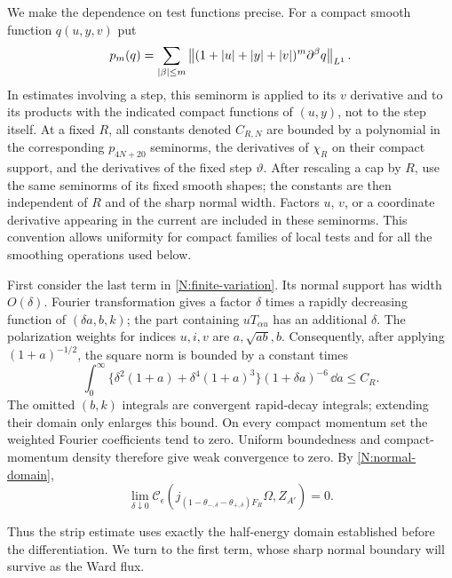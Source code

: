 We make the dependence on test functions precise.  For a compact
smooth function $q(u,y,v)$ put
\[
 p_m(q)=\sum_{|\beta|\leq m}
  \left\lVert(1+|u|+|y|+|v|)^m\partial^\beta q\right\rVert_{L^1}.
\]
In estimates involving a step, this seminorm is applied to its $v$
derivative and to its products with the indicated compact functions
of $(u,y)$, not to the step itself.  At a fixed $R$, all constants
denoted $C_{R,N}$ are bounded by a polynomial in the corresponding
$p_{4N+20}$ seminorms, the derivatives of $\chi_R$ on their compact
support, and the derivatives of the fixed step $\vartheta$.  After
rescaling a cap by $R$, use the same seminorms of its fixed smooth
shapes; the constants are then independent of $R$ and of the sharp
normal width.  Factors $u$, $v$, or a coordinate derivative appearing
in the current are included in these seminorms.  This convention
allows uniformity for compact families of local tests and for all
the smoothing operations used below.

First consider the last term in \eqref{N:finite-variation}.  Its
normal support has width $O(\delta)$.  Fourier transformation gives
a factor $\delta$ times a rapidly decreasing function of
$(\delta a,b,k)$; the part containing $uT_{\alpha u}$ has an additional
$\delta$.  The polarization weights for indices $u,i,v$ are
$a,\sqrt{ab},b$.  Consequently, after applying $(1+a)^{-1/2}$,
the square norm is bounded by a constant times
\begin{equation}\label{N:strip-bound}
 \int_0^\infty
  \bigl\{\delta^2(1+a)+\delta^4(1+a)^3\bigr\}
     (1+\delta a)^{-6}\,\dd a\leq C_R.
\end{equation}
The omitted $(b,k)$ integrals are convergent rapid-decay integrals;
extending their domain only enlarges this bound.  On every compact
momentum set the weighted Fourier coefficients tend to zero.
Uniform boundedness and compact-momentum density therefore give
weak convergence to zero.  By \eqref{N:normal-domain},
\begin{equation}\label{N:strip-vanishing}
 \lim_{\delta\downarrow0}
 \mathcal C_\epsilon
 (j_{(1-\theta_{-,\delta}-\theta_{+,\delta})F_R}\Omega,Z_{A'})=0.
\end{equation}

Thus the strip estimate uses exactly the half-energy domain established
before the differentiation. We turn to the first term, whose sharp
normal boundary will survive as the Ward flux.

